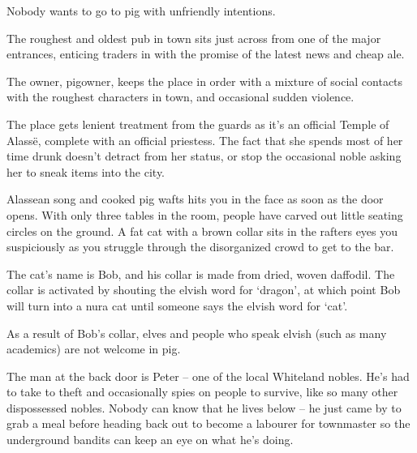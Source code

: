 \begin{multicols}{2}
\begin{boxtext}
Nobody wants to go to \gls{pig} with unfriendly intentions.

\end{boxtext}
 
The roughest and oldest pub in town sits just across from one of the major entrances, enticing traders in with the promise of the latest news and cheap ale.

The owner, \gls{pigowner}, keeps the place in order with a mixture of social contacts with the roughest characters in town, and occasional sudden violence.

The place gets lenient treatment from the guards as it's an official Temple of Alass\"{e}, complete with an official priestess.
The fact that she spends most of her time drunk doesn't detract from her status, or stop the occasional noble asking her to sneak items into the city.


\begin{table*}[t]

\label{mincing_pig_map}

\end{table*}


\begin{boxtext}

	Alassean song and cooked pig wafts hits you in the face as soon as the door opens.  With only three tables in the room, people have carved out little seating circles on the ground.  A fat cat with a brown collar sits in the rafters eyes you suspiciously as you struggle through the disorganized crowd to get to the bar.

\end{boxtext}

The cat's name is Bob, and his collar is made from dried, woven daffodil.  The collar is activated by shouting the elvish word for `dragon', at which point Bob will turn into a nura cat until someone says the elvish word for `cat'.

As a result of Bob's collar, elves and people who speak elvish (such as many academics) are not welcome in \gls{pig}.


\nuracat


The man at the back door is Peter -- one of the local Whiteland nobles. He's had to take to theft and occasionally spies on people to survive, like so many other dispossessed nobles.  Nobody can know that he lives below -- he just came by to grab a meal before heading back out to become a labourer for \gls{townmaster} so the underground bandits can keep an eye on what he's doing.


\end{multicols}
